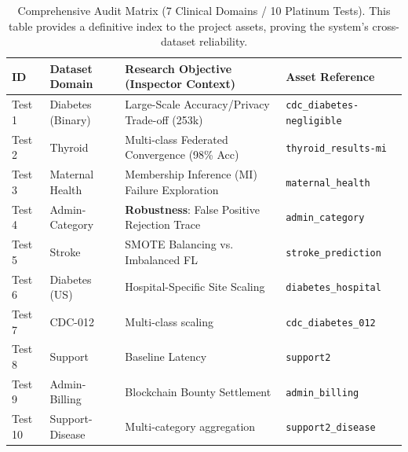 \documentclass[10pt, a4paper, twocolumn]{article}
\begin{document}
\begin{table}[hbt!]
\centering
\scriptsize
\begin{tabular}{lp{2.5cm}p{5.5cm}l}
\toprule
\textbf{ID} & \textbf{Dataset Domain} & \textbf{Research Objective (Inspector Context)} & \textbf{Asset Reference} \\
\midrule
Test 1 & Diabetes (Binary) & Large-Scale Accuracy/Privacy Trade-off (253k) & \texttt{cdc\_diabetes-negligible} \\
Test 2 & Thyroid & Multi-class Federated Convergence (98\% Acc) & \texttt{thyroid\_results-mi} \\
Test 3 & Maternal Health & Membership Inference (MI) Failure Exploration & \texttt{maternal\_health} \\
Test 4 & Admin-Category & \textbf{Robustness}: False Positive Rejection Trace & \texttt{admin\_category} \\
Test 5 & Stroke & SMOTE Balancing vs. Imbalanced FL & \texttt{stroke\_prediction} \\
Test 6 & Diabetes (US) & Hospital-Specific Site Scaling & \texttt{diabetes\_hospital} \\
Test 7 & CDC-012 & Multi-class scaling & \texttt{cdc\_diabetes\_012} \\
Test 8 & Support & Baseline Latency & \texttt{support2} \\
Test 9 & Admin-Billing & Blockchain Bounty Settlement & \texttt{admin\_billing} \\
Test 10 & Support-Disease & Multi-category aggregation & \texttt{support2\_disease} \\
\bottomrule
\end{tabular}
\caption{Comprehensive Audit Matrix (7 Clinical Domains / 10 Platinum Tests). This table provides a definitive index to the project assets, proving the system's cross-dataset reliability.}
\end{table}
\end{document}
